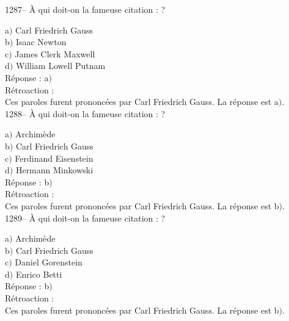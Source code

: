 ﻿\documentclass[letterpaper, 12pt]{article}
\begin{document}
1287-- \`A qui doit-on la fameuse citation : \fg?

a$)$ Carl Friedrich Gauss \\
b$)$ Isaac Newton \\
c$)$ James Clerk Maxwell \\
d$)$ William Lowell Putnam\\

R\'eponse : a$)$\\

R\'etroaction : \\
Ces paroles furent prononc\'ees par Carl Friedrich Gauss.
La r\'eponse est  a$)$.\\

1288-- \`A qui doit-on la fameuse citation : \fg ?

a$)$ Archim\`ede \\
b$)$ Carl Friedrich Gauss \\
c$)$ Ferdinand Eisenstein \\
d$)$ Hermann Minkowski\\

R\'eponse : b$)$\\

R\'etroaction : \\
Ces paroles furent prononc\'ees par Carl Friedrich Gauss.
La r\'eponse est  b$)$.\\

1289-- \`A qui doit-on la fameuse citation : \fg ?

a$)$ Archim\`ede \\
b$)$ Carl Friedrich Gauss \\
c$)$ Daniel Gorenstein \\
d$)$ Enrico Betti\\

R\'eponse : b$)$\\

R\'etroaction : \\
Ces paroles furent prononc\'ees par Carl Friedrich Gauss.
La r\'eponse est  b$)$.\\
\end{document}
